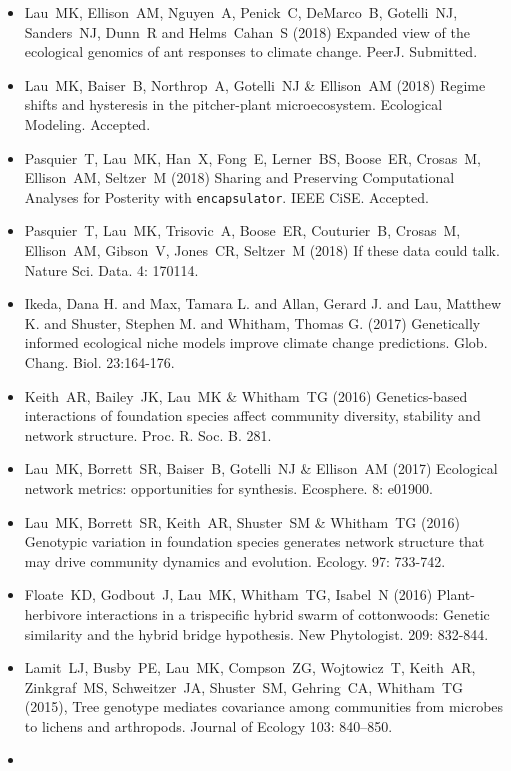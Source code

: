 \documentclass[a4paper]{article}
\begin{document}
\begin{itemize}
\item 
  Lau~MK, Ellison~AM, Nguyen~A, Penick~C, DeMarco~B, Gotelli~NJ,
  Sanders~NJ, Dunn~R and Helms~Cahan~S (2018) Expanded view of the
  ecological genomics of ant responses to climate
  change. PeerJ. Submitted.
\item 
  Lau~MK, Baiser~B, Northrop~A, Gotelli~NJ \& Ellison~AM (2018) Regime
  shifts and hysteresis in the pitcher-plant
  microecosystem. Ecological Modeling. Accepted.
\item 
  Pasquier~T, Lau~MK, Han~X, Fong~E, Lerner~BS, Boose~ER, Crosas~M,
  Ellison~AM, Seltzer~M (2018) Sharing and Preserving Computational
  Analyses for Posterity with \texttt{encapsulator}. IEEE
  CiSE. Accepted.
\item 
  Pasquier~T, Lau~MK, Trisovic~A, Boose~ER, Couturier~B, Crosas~M,
  Ellison~AM, Gibson~V, Jones~CR, Seltzer~M (2018) If these data could
  talk. Nature Sci. Data. 4: 170114.
\item  
  Ikeda, Dana H. and Max, Tamara L. and Allan, Gerard J. and Lau,
  Matthew K. and Shuster, Stephen M. and Whitham, Thomas G. (2017)
  Genetically informed ecological niche models improve climate change
  predictions. Glob. Chang. Biol. 23:164-176.
\item 
  Keith~AR, Bailey~JK, Lau~MK \& Whitham~TG (2016) Genetics-based
  interactions of foundation species affect community diversity,
  stability and network structure. Proc. R. Soc. B. 281.
\item  
  Lau~MK, Borrett~SR, Baiser~B, Gotelli~NJ \& Ellison~AM (2017)
  Ecological network metrics: opportunities for
  synthesis. Ecosphere. 8: e01900.
\item
  Lau~MK, Borrett~SR, Keith~AR, Shuster~SM \& Whitham~TG (2016)
  Genotypic variation in foundation species generates network
  structure that may drive community dynamics and
  evolution. Ecology. 97: 733-742.
\item
  Floate~KD, Godbout~J, Lau~MK, Whitham~TG, Isabel~N (2016)
  Plant-herbivore interactions in a trispecific hybrid swarm of
  cottonwoods: Genetic similarity and the hybrid bridge
  hypothesis. New Phytologist. 209: 832-844.
\item 
  Lamit~LJ, Busby~PE, Lau~MK, Compson~ZG, Wojtowicz~T, Keith~AR,
  Zinkgraf~MS, Schweitzer~JA, Shuster~SM, Gehring~CA, Whitham~TG
  (2015), Tree genotype mediates covariance among communities from
  microbes to lichens and arthropods. Journal of Ecology 103: 840–850.
\item

\end{itemize}
\end{document}
